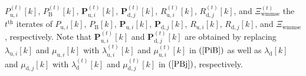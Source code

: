 \documentclass[10pt,journal]{IEEEtran}
\newcommand{\paren}[1]{\left({#1}\right)}
\newcommand{\bracket}[1]{{\left [{#1}\right ]}}
\newcommand{\ith}[1]    {{#1}^{\underline{\text{th}}}}
\newcommand{\PiB}{\mathbf{P}_{\textrm{u},i}\bracket{k}}
\newcommand{\PBj}{\mathbf{P}_{\textrm{d},j}\bracket{k}}
\theoremstyle{definition}
\begin{document}
$P^{\paren{t}}_{\textrm{u},i}\bracket{k}$, $P^{\paren{t}}_{\textrm{B}}\bracket{k}$,
$\mathbf{P}^{\paren{t}}_{\textrm{u},i}\bracket{k}$, $\mathbf{P}^{\paren{t}}_{\textrm{d},j}\bracket{k}$, $\mathit{R}^{\paren{t}}_{\textrm{u},i}\bracket{k}$, $\mathit{R}^{\paren{t}}_{\textrm{d},j}\bracket{k}$, and $\Xi^{\paren{t}}_{\textrm{wmmse}}$ the $\ith{t}$ iterates of $P_{\textrm{u},i}\bracket{k}$, $P_{\textrm{B}}\bracket{k}$,  $\PiB$, $\PBj$, $\mathit{R}_{\textrm{u},i}\bracket{k}$, $\mathit{R}_{\textrm{d},j}\bracket{k}$, and $\Xi_{\textrm{wmmse}}$, respectively. Note that $\mathbf{P}^{\paren{t}}_{\textrm{u},i}\bracket{k}$ and $\mathbf{P}^{\paren{t}}_{\textrm{d},j}\bracket{k}$ are obtained by replacing $\lambda_{\textrm{u},i}\bracket{k}$ and $\mu_{\textrm{u},i}\bracket{k}$ with $\lambda^{\paren{t}}_{\textrm{u},i}\bracket{k}$ and $\mu^{\paren{t}}_{\textrm{u},i}\bracket{k}$ in $\paren{\mathrm{\ref{PiB}}}$ as well as $\lambda_{\textrm{d}}\bracket{k}$ and $\mu_{\textrm{d},j}\bracket{k}$ with $\lambda^{\paren{t}}_{\textrm{d}}\bracket{k}$ and $\mu^{\paren{t}}_{\textrm{d},j}\bracket{k}$ in $\paren{\mathrm{\ref{PBj}}}$, respectively. %
\end{document}
